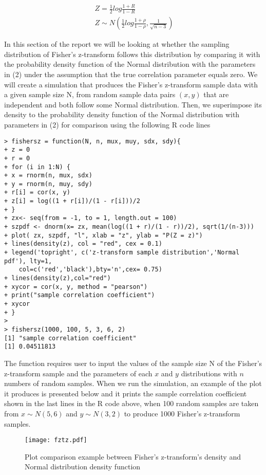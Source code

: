 \documentclass[11pt,a4]{article}
\begin{document}
\bigskip

\begin{align}
\ Z = \frac 12 log\frac{1 + R}{1 - R}\\
\ Z \sim N(\frac 12 log\frac{1 + \rho}{1 - \rho},\frac{1}{\sqrt{n-3}})
\end{align}

\bigskip

In this section of the report we will be looking at whether the sampling distribution of Fisher’s z-transform follows this distribution by comparing it with the probability density function of the Normal distribution with the parameters in (2) under the assumption that the true correlation parameter equals zero. We will create a simulation that produces the Fisher’s z-transform sample data with a given sample size N, from random sample data pairs $(x,y)$ that are independent and both follow some Normal distribution. Then, we superimpose its density to the probability density function of the Normal distribution with parameters in (2) for comparison using the following R code lines 	

\begin{verbatim}
> fishersz = function(N, n, mux, muy, sdx, sdy){
+ z = 0
+ r = 0
+ for (i in 1:N) {
+ x = rnorm(n, mux, sdx)
+ y = rnorm(n, muy, sdy)
+ r[i] = cor(x, y)
+ z[i] = log((1 + r[i])/(1 - r[i]))/2
+ }
+ zx<- seq(from = -1, to = 1, length.out = 100)
+ szpdf <- dnorm(x= zx, mean(log((1 + r)/(1 - r))/2), sqrt(1/(n-3)))
+ plot( zx, szpdf, "l", xlab = "z", ylab = "P(Z = z)")
+ lines(density(z), col = "red", cex = 0.1)
+ legend('topright', c('z-transform sample distribution','Normal pdf'), lty=1,
    col=c('red','black'),bty='n',cex= 0.75)
+ lines(density(z),col="red")
+ xycor = cor(x, y, method = "pearson")
+ print("sample correlation coefficient")
+ xycor
+ }
> 
> fishersz(1000, 100, 5, 3, 6, 2)
[1] "sample correlation coefficient"
[1] 0.04511813
\end{verbatim}

The function requires user to input the values of the sample size N of the Fisher's z-transform sample and the parameters of each $x$ and $y$ distributions with $n$ numbers of random samples. When we run the simulation, an example of the plot it produces is presented below and it prints the sample correlation coefficient shown in the last lines in the R code above, when 100 random samples are taken from $x \sim N(5,6)$ and $y \sim N(3,2)$ to produce 1000 Fisher's z-transform samples.

\begin{figure}[hbt!]
    \centering
    \texttt{[image: fztz.pdf]}
    \caption{Plot comparison example between Fisher's z-transform's density and Normal distribution density function}
    \label{fig4}
\end{figure}
\end{document}
